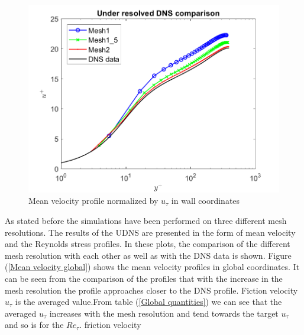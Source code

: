 \begin{figure}[h]
    \centering
    \includegraphics[width=1\textwidth]{06_Resultsanddiscussion/figur/UDNS_2016/Profile_wall_coords_theo_comp.png}
    \caption{Mean velocity profile normalized by $u_\tau$ in wall coordinates}
    \label{Mean velocity wall}
\end{figure}

As stated before the simulations have been performed on three different mesh resolutions. The results of the UDNS are presented in the form of mean velocity and the Reynolds stress profiles. In these plots, the comparison of the different mesh resolution with each other as well as with the DNS data is shown. Figure (\ref{Mean velocity global}) shows the mean velocity profiles in global coordinates. It can be seen from the comparison of the profiles that with the increase in the mesh resolution the profile approaches closer to the DNS profile. 
Fiction velocity $u_\tau$ is the averaged value.From table (\ref{Global quantities}) we can see that the averaged $u_\tau$ increases with the mesh resolution and tend towards the target $u_\tau$ and so is for the $Re_\tau$.   friction velocity 